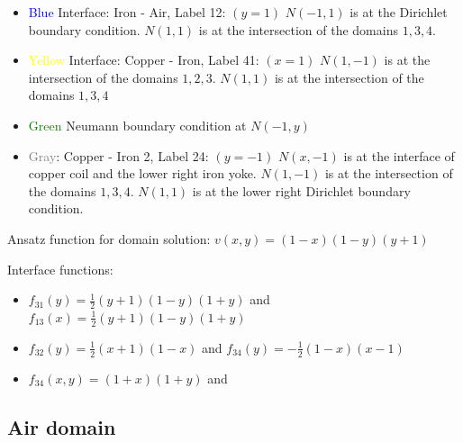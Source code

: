 \documentclass[12pt]{article}
\begin{document}
\begin{itemize}
	\item \textcolor{blue}{Blue} Interface: Iron - Air, Label 12: $(y=1)$ $N(-1,1)$ is at the Dirichlet boundary condition. $N(1,1)$ is at the intersection of the domains $1,3,4$.
	\item \textcolor{yellow}{Yellow} Interface: Copper - Iron, Label 41: $(x=1)$ $N(1,-1)$ is at the intersection of the domains $1,2,3$. $N(1,1)$ is at the intersection of the domains $1,3,4$
     \item \textcolor{green}{Green} Neumann boundary condition at $N(-1,y)$
     \item \textcolor{gray}{Gray}: Copper - Iron 2, Label 24: $(y=-1)$ $N(x,-1)$ is at the interface of copper coil and the lower right iron yoke. $N(1,-1)$ is at the intersection of the domains $1,3,4$. $N(1,1)$ is at the lower right Dirichlet boundary condition.
\end{itemize}
Ansatz function for domain solution: $v(x,y) = (1-x)(1-y)(y+1)$

Interface functions:
\begin{itemize}
	\item $f_{31}(y) = \frac{1}{2}(y+1)(1-y)(1+y)$ and $f_{13}(x) = \frac{1}{2}(y+1)(1-y)(1+y)$
    \item $f_{32}(y) = \frac{1}{2} (x+1) (1-x)$  and $f_{34}(y) = -\frac{1}{2}(1-x)(x-1)$
    \item $f_{34}(x,y) = (1+x)(1+y)$ and 
\end{itemize}

\subsection*{Air domain}
\begin{figure}
\centering
{}
\end{figure}
\end{document}
